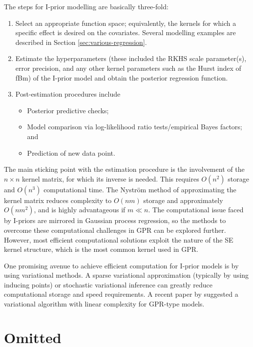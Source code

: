 \documentclass[a4paper,showframe,11pt]{report}
\begin{document}
The steps for I-prior modelling are basically three-fold:
\begin{enumerate}
  \item Select an appropriate function space; equivalently, the kernels for which a specific effect is desired on the covariates. Several modelling examples are described in Section \ref{sec:various-regression}.
  \item Estimate the hyperparameters (these included the RKHS scale parameter(s), error precision, and any other kernel parameters such as the Hurst index of fBm) of the I-prior model and obtain the posterior regression function.
  \item Post-estimation procedures include
  \begin{itemize}
    \item Posterior predictive checks;
    \item Model comparison via log-likelihood ratio tests/empirical Bayes factors; and
    \item Prediction of new data point.
  \end{itemize}
\end{enumerate}

The main sticking point with the estimation procedure is the involvement of the $n\times n$ kernel matrix, for which its inverse is needed.
This requires $O(n^2)$ storage and $O(n^3)$ computational time.
The Nyström method of approximating the kernel matrix reduces complexity to $O(nm)$ storage and approximately $O(nm^2)$, and is highly advantageous if $m \ll n$.
The computational issue faced by I-priors are mirrored in Gaussian process regression, so the methods to overcome these computational challenges in GPR can be explored further.
However, most efficient computational solutions exploit the nature of the SE kernel structure, which is the most common kernel used in GPR.

One promising avenue to achieve efficient computation for I-prior models is by using variational methods.
A sparse variational approximation (typically by using inducing points) or stochastic variational inference can greatly reduce computational storage and speed requirements.
A recent paper by \citet{cheng2017variational} suggested a variational algorithm with linear complexity for GPR-type models.


\section*{Omitted}


\hClosingStuffStandalone
\end{document}
